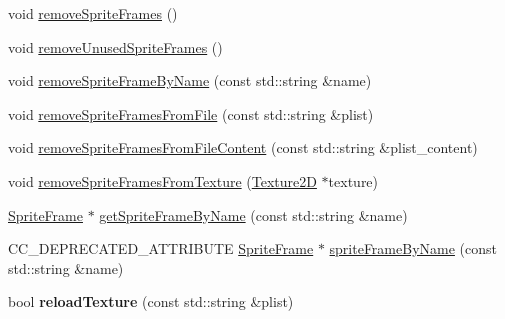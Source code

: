 \begin{DoxyCompactItemize}
void \hyperlink{classSpriteFrameCache_ad39158545a4c85b1ef33187450e1e7f0}{remove\+Sprite\+Frames} ()
\item 
void \hyperlink{classSpriteFrameCache_a056756d97a724f7d8ef9efd1c9a11074}{remove\+Unused\+Sprite\+Frames} ()
\item 
void \hyperlink{classSpriteFrameCache_a970b7aba25986a18fe2353bf1e587f44}{remove\+Sprite\+Frame\+By\+Name} (const std\+::string \&name)
\item 
void \hyperlink{classSpriteFrameCache_a1edf0ddf258ccb7ea843379f5b99aac5}{remove\+Sprite\+Frames\+From\+File} (const std\+::string \&plist)
\item 
void \hyperlink{classSpriteFrameCache_afbc12b894257ad87d0e638b9ce7decab}{remove\+Sprite\+Frames\+From\+File\+Content} (const std\+::string \&plist\+\_\+content)
\item 
void \hyperlink{classSpriteFrameCache_a410989581ec0f9da9914b512d672e2dc}{remove\+Sprite\+Frames\+From\+Texture} (\hyperlink{classTexture2D}{Texture2D} $\ast$texture)
\item 
\hyperlink{classSpriteFrame}{Sprite\+Frame} $\ast$ \hyperlink{classSpriteFrameCache_a4a57d65bae4061e8d559c0fb7150e15c}{get\+Sprite\+Frame\+By\+Name} (const std\+::string \&name)
\item 
C\+C\+\_\+\+D\+E\+P\+R\+E\+C\+A\+T\+E\+D\+\_\+\+A\+T\+T\+R\+I\+B\+U\+TE \hyperlink{classSpriteFrame}{Sprite\+Frame} $\ast$ \hyperlink{classSpriteFrameCache_a8118bf96fc4d957e3ed68f9990fb2d74}{sprite\+Frame\+By\+Name} (const std\+::string \&name)
\item 
\mbox{\label{classSpriteFrameCache_acc5c36275d0f4c28ba95d0c8846c5188}} 
bool {\bfseries reload\+Texture} (const std\+::string \&plist)
\end{DoxyCompactItemize}
